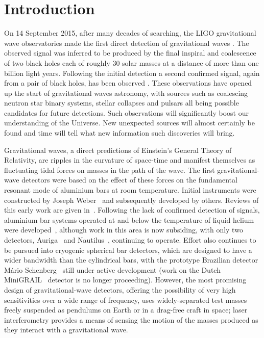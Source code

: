 \section{Introduction}
\label{section:introduction} 


On 14 September 2015, after many decades of searching, the LIGO gravitational wave
observatories made the first direct detection of gravitational waves \cite{GW150914}.
The observed signal was inferred to be produced by the final inspiral and coalescence
of two black holes each of roughly 30 solar masses at a distance of more than one billion
light years. Following the initial detection a second confirmed signal, again from a pair
of black holes, has been observed \cite{GW151226}. These observations have opened up the start of
gravitational waves astronomy, with sources such as coalescing neutron star binary
systems, stellar collapses and pulsars all being possible candidates for future detections.
Such observations will significantly boost our understanding of the
Universe. New unexpected sources will almost certainly be found and time will
tell what new information such discoveries will bring.

Gravitational waves, a direct predictions of Einstein's General
Theory of Relativity, are ripples in the curvature of space-time and manifest themselves as fluctuating
tidal forces on masses in the path of the wave. The first gravitational-wave
detectors were based on the effect of these forces on the fundamental resonant
mode of aluminium bars at room temperature. Initial instruments were constructed
by Joseph Weber~\cite{Weber1, Weber2} and subsequently developed by others.
Reviews of this early work are given in~\cite{Tyson, Douglass}. Following the
lack of confirmed detection of signals, aluminium bar systems operated at and
below the temperature of liquid helium were developed~\cite{Astone, Prodi,
Amaldi, Heng}, although work in this area is now subsiding, with only two
detectors, Auriga~\cite{AURIGA} and Nautilus~\cite{NAUTILUS}, continuing to
operate. Effort also continues to be pursued into cryogenic spherical bar
detectors, which are designed to have a wider bandwidth than the cylindrical
bars, with the prototype Brazilian detector M\'{a}rio Schenberg~\cite{Schenberg, Aguiar:2006} still under active development (work on the
Dutch MiniGRAIL~\cite{MiniGRAIL, Gottardi:2007} detector is no longer proceeding).
However, the most promising design of gravitational-wave detectors, offering the
possibility of very high sensitivities over a wide range of frequency, uses
widely-separated test masses freely suspended as pendulums on Earth or
in a drag-free craft in space; laser interferometry provides a means
of sensing the motion of the masses produced as they interact with a
gravitational wave.


